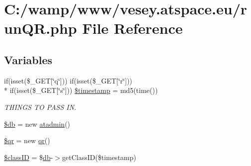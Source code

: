 \hypertarget{run_q_r_8php}{\section{C\-:/wamp/www/vesey.atspace.\-eu/run\-Q\-R.php File Reference}
\label{run_q_r_8php}
}
\subsection*{Variables}
\begin{DoxyCompactItemize}
\item 
if(isset(\$\-\_\-\-G\-E\-T\mbox{[}\char`\"{}q\char`\"{}\mbox{]})) if(isset(\$\-\_\-\-G\-E\-T\mbox{[}\char`\"{}r\char`\"{}\mbox{]})) \\*
if(isset(\$\-\_\-\-G\-E\-T\mbox{[}\char`\"{}s\char`\"{}\mbox{]})) \hyperlink{run_q_r_8php_ada866527a98211212db3b2e4342397c9}{\$timestamp} = md5(time())
\begin{DoxyCompactList}\small\item\em T\-H\-I\-N\-G\-S T\-O P\-A\-S\-S I\-N. \end{DoxyCompactList}\item 
\hyperlink{run_q_r_8php_a1fa3127fc82f96b1436d871ef02be319}{\$db} = new \hyperlink{classatadmin}{atadmin}()
\item 
\hyperlink{run_q_r_8php_a2357c56e11778cb14e3c86756ae724be}{\$qr} = new \hyperlink{classqr}{qr}()
\item 
\hyperlink{run_q_r_8php_a48ffa401b856e5d2f7f4617bb2a8d580}{\$class\-I\-D} = \$\hyperlink{classdb}{db}-\/$>$get\-Class\-I\-D(\$timestamp)
\end{DoxyCompactItemize}


